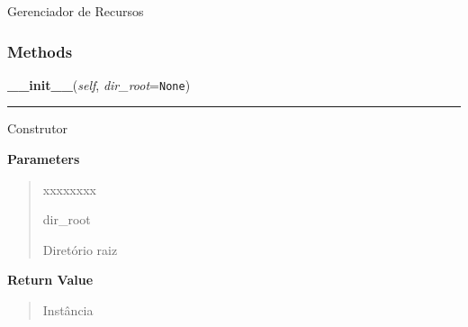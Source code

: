     \label{pygame-asteroids:resource_manager:ResourceManager}
Gerenciador de Recursos



  \subsubsection{Methods}

    \label{pygame-asteroids:resource_manager:ResourceManager:__init__}

    \vspace{0.5ex}

\hspace{.8\funcindent}\begin{boxedminipage}{\funcwidth}

    \raggedright \textbf{\_\_init\_\_}(\textit{self}, \textit{dir\_root}={\tt None})

    \vspace{-1.5ex}

    \rule{\textwidth}{0.5\fboxrule}
\setlength{\parskip}{2ex}
    Construtor

\setlength{\parskip}{1ex}
      \textbf{Parameters}
      \vspace{-1ex}

      \begin{quote}
        \begin{Ventry}{xxxxxxxx}

          \item[dir\_root]

          Diretório raiz

        \end{Ventry}

      \end{quote}

      \textbf{Return Value}
    \vspace{-1ex}

      \begin{quote}
      Instância

      \end{quote}

    \end{boxedminipage}

